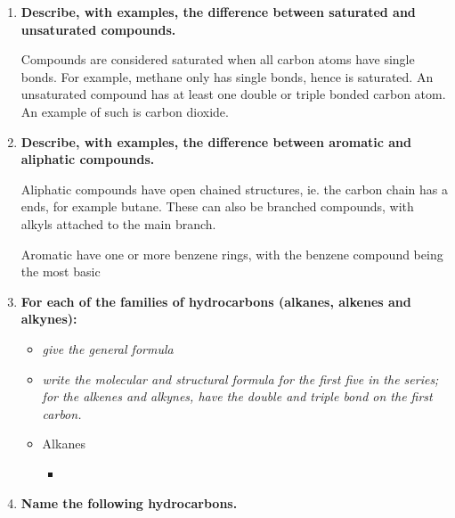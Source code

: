 \documentclass{report}
\begin{document}
\begin{enumerate}
		\item \textbf{Describe, with examples, the difference between saturated and unsaturated compounds.}

			Compounds are considered saturated when all carbon atoms have single bonds. For example, methane only has single bonds, hence is saturated. An unsaturated compound has at least one double or triple bonded carbon atom. An example of such is carbon dioxide.
		    
		\item \textbf{Describe, with examples, the difference between aromatic and aliphatic compounds.}

			Aliphatic compounds have open chained structures, ie. the carbon chain has a ends, for example butane. These can also be branched compounds, with alkyls attached to the main branch.

			Aromatic have one or more benzene rings, with the benzene compound being the most basic
		    
		\item \textbf{For each of the families of hydrocarbons (alkanes, alkenes and alkynes):}

			\begin{itemize}
				\item \textit{give the general formula}
				\item \textit{write the molecular and structural formula for the first five in the series; for the alkenes and alkynes, have the double and triple bond on the first carbon.}
			\end{itemize}

			\begin{itemize}
				\item Alkanes
				\begin{itemize}
					\item 
				\end{itemize}
			\end{itemize}
		    
		\item \textbf{Name the following hydrocarbons.}
	\end{enumerate}
\end{document}
